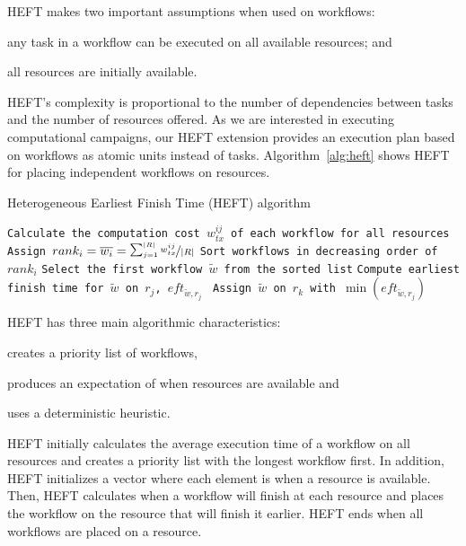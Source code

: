 HEFT makes two important assumptions when used on workflows:
\begin{inparaenum}[(1)]
    \item any task in a workflow can be executed on all available resources; and
    \item all resources are initially available.
\end{inparaenum}
HEFT's complexity is proportional to the number of dependencies between tasks
and the number of resources offered. As we are interested in executing
computational campaigns, our HEFT extension provides an execution plan based
on workflows as atomic units instead of tasks. Algorithm~\ref{alg:heft} shows
HEFT for placing independent workflows on resources.

\begin{algorithm}[t]
    \caption{Heterogeneous Earliest Finish Time (HEFT) algorithm}
    \label{alg:heft}
    \scriptsize
    \begin{algorithmic}[1]
        \State \texttt{Calculate the computation cost $w_{tx}^{ij}$ of each workflow for all resources}
        \State \texttt{Assign $rank_i = \overline{w_{i}} = \nicefrac{\sum_{j=1}^{|R|}w_{tx}^{ij}}{|R|}$}
        \State \texttt{Sort workflows in decreasing order of $rank_i$}
        \State \texttt{Select the first workflow $\tilde{w}$ from the sorted list}
        \State\texttt{Compute earliest finish time for $\tilde{w}$ on $r_{j}$, $eft_{\tilde{w},r_j}$ }
        \EndFor
        \State \texttt{Assign  $\tilde{w}$ on $r_k$ with $\min{(eft_{\tilde{w},r_j})}$}
        \EndWhile
        \EndProcedure
    \end{algorithmic}
\end{algorithm}

HEFT has three main algorithmic characteristics:
\begin{inparaenum}[1)]
    \item creates a priority list of workflows,
    \item produces an expectation of when resources are available and
    \item uses a deterministic heuristic.
\end{inparaenum}
HEFT initially calculates the average execution time of a workflow on all
resources and creates a priority list with the longest workflow first. In
addition, HEFT initializes a vector where each element is when a resource is
available. Then, HEFT calculates when a workflow will finish at each resource
and places the workflow on the resource that will finish it earlier. HEFT ends
when all workflows are placed on a resource.


